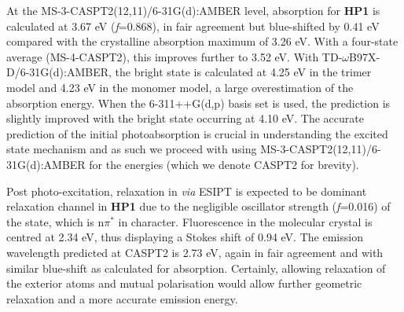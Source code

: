 At the MS-3-CASPT2(12,11)/6-31G(d):AMBER level, absorption for \textbf{HP1} is calculated at 3.67 eV (\textit{f}=0.868), in fair agreement but blue-shifted by 0.41 eV compared with the crystalline absorption maximum of 3.26 eV.\cite{Tang2016} 
With a four-state average (MS-4-CASPT2), this improves further to 3.52 eV. With TD-$\omega$B97X-D/6-31G(d):AMBER, the bright state is calculated at 4.25 eV in the trimer model and 4.23 eV in the monomer model, a large overestimation of the absorption energy. When the 6-311++G(d,p) basis set is used, the prediction is slightly improved with the bright state occurring at 4.10 eV. The accurate prediction of the initial photoabsorption is crucial in understanding the excited state mechanism and as such we proceed with using MS-3-CASPT2(12,11)/6-31G(d):AMBER for the energies (which we denote CASPT2 for brevity). %

Post photo-excitation, relaxation in \sone{} \textit{via}  ESIPT is expected to be dominant relaxation channel in \textbf{HP1} due to the negligible oscillator strength (\textit{f}=0.016) of the \stwo{} state, which is n$\pi^\ast{}$ in character. Fluorescence in the molecular crystal is centred at 2.34 eV, thus displaying a Stokes shift of 0.94 eV. The emission wavelength predicted at CASPT2 is 2.73 eV, again in fair agreement and with similar blue-shift as calculated for absorption. Certainly, allowing relaxation of the exterior atoms and mutual polarisation would allow further geometric relaxation and a more accurate emission energy.

